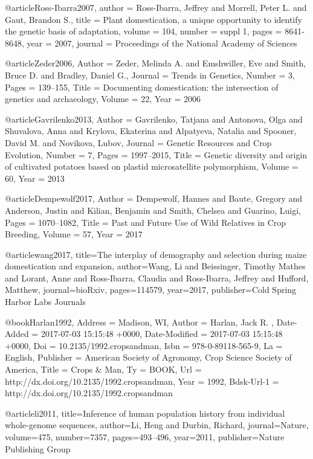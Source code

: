 
@article{Ross-Ibarra2007,
author = {Ross-Ibarra, Jeffrey and Morrell, Peter L. and Gaut, Brandon S.}, 
title = {Plant domestication, a unique opportunity to identify the genetic basis of adaptation},
volume = {104}, 
number = {suppl 1}, 
pages = {8641-8648}, 
year = {2007}, 
journal = {Proceedings of the National Academy of Sciences} 
}

@article{Zeder2006,
	Author = {Zeder, Melinda A. and Emshwiller, Eve and Smith, Bruce D. and Bradley, Daniel G.},
	Journal = {Trends in Genetics},
	Number = {3},
	Pages = {139--155},
	Title = {Documenting domestication: the intersection of genetics and archaeology},
	Volume = {22},
	Year = {2006}}

@article{Gavrilenko2013,
	Author = {Gavrilenko, Tatjana and Antonova, Olga and Shuvalova, Anna and Krylova, Ekaterina and Alpatyeva, Natalia and Spooner, David M. and Novikova, Lubov},
	Journal = {Genetic Resources and Crop Evolution},
	Number = {7},
	Pages = {1997--2015},
	Title = {Genetic diversity and origin of cultivated potatoes based on plastid microsatellite polymorphism},
	Volume = {60},
	Year = {2013}
}

@article{Dempewolf2017,
	Author = {Dempewolf, Hannes and Baute, Gregory and Anderson, Justin and Kilian, Benjamin and Smith, Chelsea and Guarino, Luigi},
	Pages = {1070--1082},
	Title = {Past and Future Use of Wild Relatives in Crop Breeding},
	Volume = {57},
	Year = {2017}
}

@article{wang2017,
  title={The interplay of demography and selection during maize domestication and expansion},
  author={Wang, Li and Beissinger, Timothy Mathes and Lorant, Anne and Ross-Ibarra, Claudia and Ross-Ibarra, Jeffrey and Hufford, Matthew},
  journal={bioRxiv},
  pages={114579},
  year={2017},
  publisher={Cold Spring Harbor Labs Journals}
}

@book{Harlan1992,
	Address = {Madison, WI},
	Author = {Harlan, Jack R. },
	Date-Added = {2017-07-03 15:15:48 +0000},
	Date-Modified = {2017-07-03 15:15:48 +0000},
	Doi = {10.2135/1992.cropsandman},
	Isbn = {978-0-89118-565-9},
	La = {English},
	Publisher = {American Society of Agronomy, Crop Science Society of America},
	Title = {Crops \& Man},
	Ty = {BOOK},
	Url = {http://dx.doi.org/10.2135/1992.cropsandman},
	Year = {1992},
	Bdsk-Url-1 = {http://dx.doi.org/10.2135/1992.cropsandman}
}


@article{li2011,
  title={Inference of human population history from individual whole-genome sequences},
  author={Li, Heng and Durbin, Richard},
  journal={Nature},
  volume={475},
  number={7357},
  pages={493--496},
  year={2011},
  publisher={Nature Publishing Group}
}	

